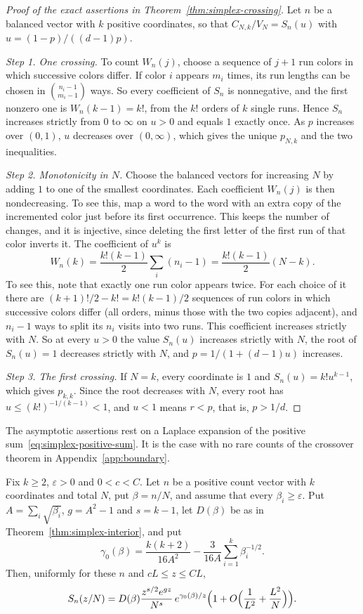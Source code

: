\begin{proof}[Proof of the exact assertions in Theorem~\ref{thm:simplex-crossing}]
Let $n$ be a balanced vector with $k$ positive coordinates, so that
$C_{N,k}/V_N=S_n(u)$ with $u=(1-p)/((d-1)p)$.

\emph{Step 1. One crossing.} To count $W_n(j)$, choose a sequence of $j+1$ run
colors in which successive colors differ. If color $i$ appears $m_i$ times, its
run lengths can be chosen in $\binom{n_i-1}{m_i-1}$ ways. So every coefficient
of $S_n$ is nonnegative, and the first nonzero one is $W_n(k-1)=k!$, from the
$k!$ orders of $k$ single runs. Hence $S_n$ increases strictly from $0$ to
$\infty$ on $u>0$ and equals $1$ exactly once. As $p$ increases over $(0,1)$,
$u$ decreases over $(0,\infty)$, which gives the unique $p_{N,k}$ and the two
inequalities.

\emph{Step 2. Monotonicity in $N$.} Choose the balanced vectors for increasing
$N$ by adding $1$ to one of the smallest coordinates. Each coefficient $W_n(j)$
is then nondecreasing. To see this, map a word to the word with an extra copy of
the incremented color just before its first occurrence. This keeps the number
of changes, and it is injective, since deleting the first letter of the first
run of that color inverts it. The coefficient of $u^k$ is
\[
W_n(k)=\frac{k!(k-1)}2\sum_i(n_i-1)=\frac{k!(k-1)}2(N-k).
\]
To see this, note that exactly one run color appears twice. For each choice of it there are
$(k+1)!/2-k!=k!(k-1)/2$ sequences of run colors in which successive colors
differ (all orders, minus those with the two copies adjacent), and $n_i-1$ ways to
split its $n_i$ visits into two runs. This coefficient increases strictly with
$N$. So at every $u>0$ the value $S_n(u)$ increases strictly with $N$, the root
of $S_n(u)=1$ decreases strictly with $N$, and $p=1/(1+(d-1)u)$ increases.

\emph{Step 3. The first crossing.} If $N=k$, every coordinate is $1$ and
$S_n(u)=k!u^{k-1}$, which gives $p_{k,k}$. Since the root decreases with $N$,
every root has $u\le(k!)^{-1/(k-1)}<1$, and $u<1$ means $r<p$, that is,
$p>1/d$.
\end{proof}

The asymptotic assertions rest on a Laplace expansion of the positive
sum~\eqref{eq:simplex-positive-sum}. It is the case with no rare counts of the
crossover theorem in Appendix~\ref{app:boundary}.

\begin{lemma}\label{lem:no-rare}
Fix $k\ge2$, $\varepsilon>0$ and $0<c<C$. Let $n$ be a positive count vector
with $k$ coordinates and total $N$, put $\beta=n/N$, and assume that every
$\beta_i\ge\varepsilon$. Put $A=\sum_i\sqrt{\beta_i}$, $g=A^2-1$ and $s=k-1$,
let $D(\beta)$ be as in Theorem~\ref{thm:simplex-interior}, and put
\[
\gamma_0(\beta)=\frac{k(k+2)}{16A^2}-\frac3{16A}\sum_{i=1}^k\beta_i^{-1/2}.
\]
Then, uniformly for these $n$ and $cL\le z\le CL$,
\begin{equation}\label{eq:no-rare}
S_n(z/N)=D(\beta)\frac{z^{s/2}e^{gz}}{N^s}\,e^{\gamma_0(\beta)/z}
\Bigl(1+O\Bigl(\frac1{L^2}+\frac{L^2}N\Bigr)\Bigr).
\end{equation}
\end{lemma}

